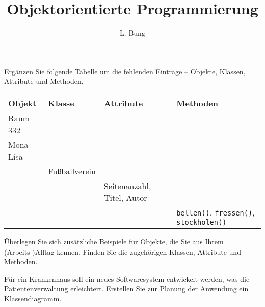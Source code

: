 \documentclass[11pt, a4paper, oneside]{article}
\begin{document}
	\author{L. Bung}
	\title{Objektorientierte \hspace{10cm} Programmierung}
	\subject{SAE}
	\maketitle
	
	
	Ergänzen Sie folgende Tabelle um die fehlenden Einträge -- Objekte, Klassen, Attribute und Methoden.
	
	\begin{table}[h]
		\centering
		\setlength\tabcolsep{.25cm}
		\renewcommand{\arraystretch}{1.5}
		\begin{tabularx}{\textwidth}{|X|X|X|X|}
			\hline
			\textbf{Objekt} & \textbf{Klasse} & \textbf{Attribute} & \textbf{Methoden}\\
			\hline
			Raum 332\vspace{1cm} & & &\\
			\hline
			Mona Lisa\vspace{1cm} &&&\\
			\hline
			& Fußballverein\vspace{1cm} & &\\
			\hline
			&& Seitenanzahl, Titel, Autor\vspace{.5cm} &\\
			\hline
			&&&\texttt{bellen()}, \texttt{fressen()}, \texttt{stockholen()}\\
			\hline
		\end{tabularx}
	\end{table}

	
	Überlegen Sie sich zusätzliche Beispiele für Objekte, die Sie aus Ihrem (Arbeits-)Alltag kennen.
	Finden Sie die zugehörigen Klassen, Attribute und Methoden.
	
	\pagebreak
	
	
	
	Für ein Krankenhaus soll ein neues Softwaresystem entwickelt werden, was die Patientenverwaltung erleichtert.
	Erstellen Sie zur Planung der Anwendung ein Klassendiagramm.
	
\end{document}
